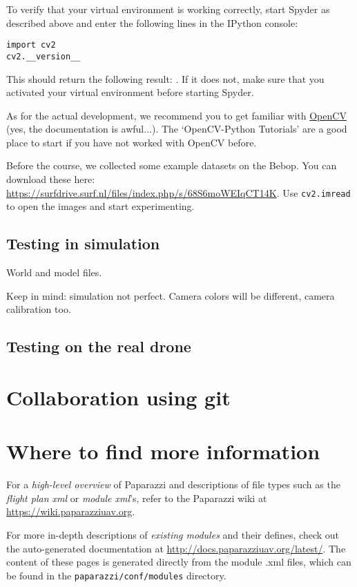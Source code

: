 \documentclass{article}
\begin{document}
To verify that your virtual environment is working correctly, start Spyder as described above and enter the following lines in the IPython console:
\begin{lstlisting}
import cv2
cv2.__version__
\end{lstlisting}
This should return the following result: . If it does not, make sure that you activated your virtual environment before starting Spyder.

As for the actual development, we recommend you to get familiar with \href{https://docs.opencv.org/3.2.0/}{OpenCV} (yes, the documentation is awful...). The `OpenCV-Python Tutorials' are a good place to start if you have not worked with OpenCV before.

Before the course, we collected some example datasets on the Bebop. You can download these here: \url{https://surfdrive.surf.nl/files/index.php/s/68S6moWEIqCT14K}. Use \texttt{cv2.imread} to open the images and start experimenting.



\subsection{Testing in simulation}
World and model files.

Keep in mind: simulation not perfect. Camera colors will be different, camera calibration too.

\subsection{Testing on the real drone}


\section{Collaboration using git}

\section{Where to find more information}
For a \emph{high-level overview} of Paparazzi and descriptions of file types such as the \emph{flight plan xml} or \emph{module xml}'s, refer to the Paparazzi wiki at \url{https://wiki.paparazziuav.org}.

For more in-depth descriptions of \emph{existing modules} and their defines, check out the auto-generated documentation at \url{http://docs.paparazziuav.org/latest/}. The content of these pages is generated directly from the module .xml files, which can be found in the \texttt{paparazzi/conf/modules} directory.
\end{document}
